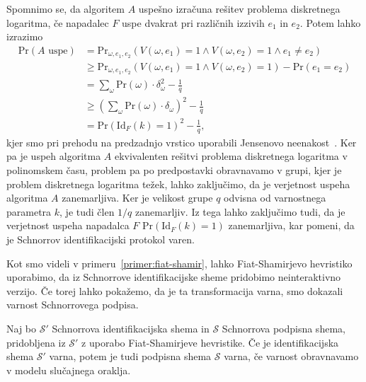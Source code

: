 \documentclass[isrm2, tisk]{fmfdelo}
\begin{document}
\begin{dokaz}
    Spomnimo se, da algoritem $A$ uspešno izračuna rešitev problema diskretnega logaritma, če napadalec
    $F$ uspe dvakrat pri različnih izzivih $e_1$ in $e_2$. Potem lahko izrazimo
    \begin{align*}
        \text{Pr}(A \text{ uspe}) &=
            \text{Pr}_{\omega, e_1, e_2}(V(\omega, e_1) = 1 \land V(\omega, e_2) = 1 \land e_1 \neq e_2) \\
                                  &\geq \text{Pr}_{\omega, e_1, e_2}(V(\omega, e_1) = 1 \land V(\omega, e_2) = 1) - \text{Pr}(e_1 = e_2) \\
                                  &= \sum_{\omega} \text{Pr}(\omega) \cdot \delta_{\omega}^2 - \frac{1}{q} \\
                                  &\geq (\sum_{\omega} \text{Pr}(\omega) \cdot \delta_{\omega})^2 - \frac{1}{q} \\
                                  &= \text{Pr}(\text{Id}_F(k) = 1)^2 - \frac{1}{q},
    \end{align*}
    kjer smo pri prehodu na predzadnjo vrstico uporabili Jensenovo neenakost~\cite{jensen}.
    Ker pa je uspeh algoritma $A$ ekvivalenten rešitvi problema diskretnega logaritma v polinomskem
    času, problem pa po predpostavki obravnavamo v grupi, kjer je problem diskretnega logaritma težek,
    lahko zaključimo, da je verjetnost uspeha algoritma $A$ zanemarljiva. Ker je velikost grupe $q$
    odvisna od varnostnega parametra $k$, je tudi člen $1/q$ zanemarljiv. Iz tega lahko zaključimo
tudi, da je verjetnost uspeha napadalca $F$ $\text{Pr}(\text{Id}_F(k) = 1)$ zanemarljiva, kar pomeni,
    da je Schnorrov identifikacijski protokol varen.
\end{dokaz}

Kot smo videli v primeru~\ref{primer:fiat-shamir}, lahko Fiat-Shamirjevo hevristiko uporabimo, da
iz Schnorrove identifikacijske sheme pridobimo neinteraktivno verzijo. Če torej lahko pokažemo,
da je ta transformacija varna, smo dokazali varnost Schnorrovega podpisa.

\begin{izrek}
\label{izrek:fiat-shamir-sec}
    Naj bo $\mathcal{S'}$ Schnorrova identifikacijska shema in $\mathcal{S}$ Schnorrova podpisna
    shema, pridobljena iz $\mathcal{S'}$ z uporabo Fiat-Shamirjeve hevristike. Če je identifikacijska
    shema $\mathcal{S'}$ varna, potem je tudi podpisna shema $\mathcal{S}$ varna, če varnost
    obravnavamo v modelu slučajnega oraklja.
\end{izrek}
\end{document}
